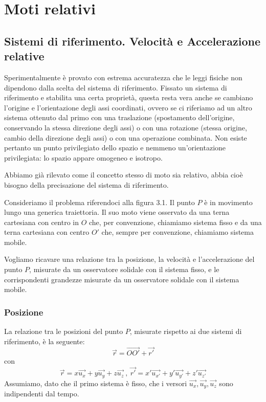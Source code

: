 \documentclass[class=book, crop=false, oneside, 12pt]{standalone}
\begin{document}
\chapter{Moti relativi}

\section{Sistemi di riferimento. Velocità e Accelerazione relative}

Sperimentalmente è provato con estrema accuratezza che le leggi fisiche non dipendono dalla scelta del sistema di riferimento. 
Fissato un sistema di riferimento e stabilita una certa proprietà, questa resta vera anche se cambiano l'origine e l'orientazione degli assi coordinati, ovvero se ci riferiamo ad un altro sistema ottenuto dal primo con una traslazione (spostamento dell'origine, conservando la stessa direzione degli assi) o con una rotazione (stessa origine, cambio della direzione degli assi) o con una operazione combinata.
Non esiste pertanto un punto privilegiato dello spazio e nemmeno un'orientazione privilegiata: lo spazio appare omogeneo e isotropo. 

Abbiamo già rilevato come il concetto stesso di moto sia relativo,  abbia cioè bisogno della precisazione del sistema di riferimento. 

Consideriamo il problema riferendoci alla figura 3.1. 
Il punto \(P\) è in movimento lungo una generica traiettoria. 
Il suo moto viene osservato da una terna cartesiana con centro in \(O\) che, per convenzione, chiamiamo sistema fisso e da una terna cartesiana con centro \(O'\) che, sempre per convenzione, chiamiamo sistema mobile.

Vogliamo ricavare una relazione tra la posizione, la velocità e l'accelerazione del punto \(P\), misurate da un osservatore solidale con il sistema fisso, e le corrispondenti grandezze misurate da un osservatore solidale con il sistema mobile. 

\subsection{Posizione}

La relazione tra le posizioni del punto \(P\), misurate rispetto ai due sistemi di riferimento, è la seguente:
\begin{equation}
    \overrightarrow{r} = \overrightarrow{OO'} + \overrightarrow{r'}
\end{equation}
con 
\begin{equation*}
    \overrightarrow{r} = x \overrightarrow{u_x} + y \overrightarrow{u_y} + z \overrightarrow{u_z} \ , \ \overrightarrow{r'} = x' \overrightarrow{u_{x'}} + y' \overrightarrow{u_{y'}} + z' \overrightarrow{u_{z'}} 
\end{equation*}
Assumiamo, dato che il primo sistema è fisso, che i versori \(\overrightarrow{u_x}, \overrightarrow{u_y}, \overrightarrow{u_z}\) sono indipendenti dal tempo.
\end{document}
